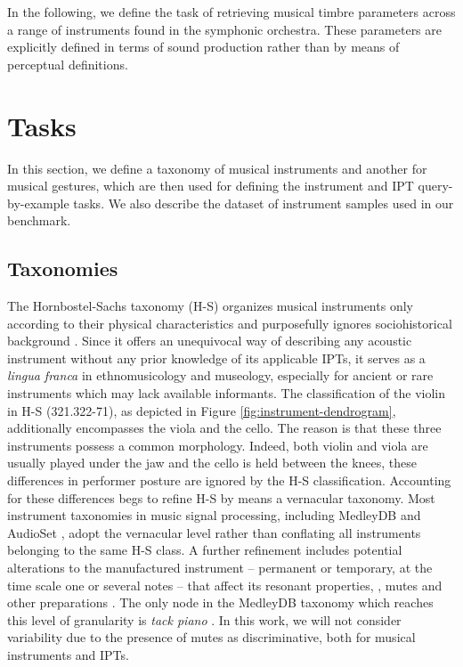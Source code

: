 In the following, we define the task of retrieving musical timbre parameters across a range of instruments found in the symphonic orchestra.
These parameters are explicitly defined in terms of sound production rather than by means of perceptual definitions.

\section{Tasks}
In this section, we define a taxonomy of musical instruments and another for musical gestures, which are then used for defining the instrument and IPT query-by-example tasks.
We also describe the dataset of instrument samples used in our benchmark.

\subsection{Taxonomies}

The Hornbostel-Sachs taxonomy (H-S) organizes musical instruments only according to their physical characteristics and purposefully ignores sociohistorical background \cite{montagu2009muzyka}.
Since it offers an unequivocal way of describing any acoustic instrument without any prior knowledge of its applicable IPTs, it serves as a \emph{lingua franca} in ethnomusicology and museology, especially for ancient or rare instruments which may lack available informants.
The classification of the violin in H-S (321.322-71), as depicted in Figure \ref{fig:instrument-dendrogram}, additionally encompasses the viola and the cello.
The reason is that these three instruments possess a common morphology.
Indeed, both violin and viola are usually played under the jaw and the cello is held between the knees, these differences in performer posture are ignored by the H-S classification.
Accounting for these differences begs to refine H-S by means a vernacular taxonomy.
Most instrument taxonomies in music signal processing, including MedleyDB \cite{bittner2014ismir} and AudioSet \cite{gemmeke2017icassp}, adopt the vernacular level rather than conflating all instruments belonging to the same H-S class.
A further refinement includes potential alterations to the manufactured instrument -- permanent or temporary, at the time scale one or several notes -- that affect its resonant properties, \eg{}, mutes and other preparations \cite{dianova2007phd}.
The only node in the MedleyDB taxonomy which reaches this level of granularity is \emph{tack piano} \cite{bittner2014ismir} .
In this work, we will not consider variability due to the presence of mutes as discriminative, both for musical instruments and IPTs.


